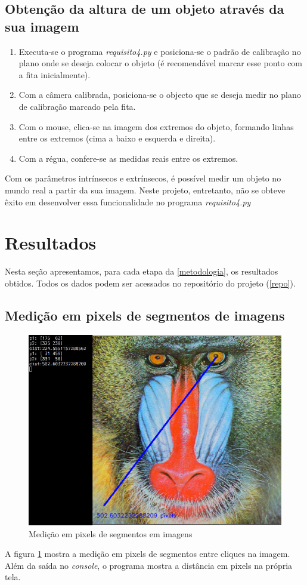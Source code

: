 \documentclass[conference]{IEEEtran}
\begin{document}
\subsection{Obtenção da altura de um objeto através da sua imagem}
\begin{enumerate}
\item Executa-se o programa \textit{requisito4.py} e posiciona-se o padrão de calibração no plano onde se deseja colocar o objeto (é recomendável marcar esse ponto com a fita inicialmente).
\item Com a câmera calibrada, posiciona-se o objecto que se deseja medir no plano de calibração marcado pela fita.
\item Com o mouse, clica-se na imagem dos extremos do objeto, formando linhas entre os extremos (cima a baixo e esquerda e direita).
\item Com a régua, confere-se as medidas reais entre os extremos.
\end{enumerate}
Com os parâmetros intrínsecos e extrínsecos,  é possível medir um objeto no mundo real a partir da sua imagem. Neste projeto, entretanto, não se obteve êxito em desenvolver essa funcionalidade no programa \textit{requisito4.py}

\section{Resultados}
Nesta seção apresentamos, para cada etapa da \ref{metodologia}, os resultados obtidos. Todos os dados podem ser acessados no repositório do projeto (\ref{repo}).
\subsection{Medição em pixels de segmentos de imagens}
\begin{figure}[ht!]\label{baboon}
\begin{center}
\includegraphics[width= .5\columnwidth]{baboon.jpg}
\caption{Medição em pixels de segmentos em imagens}
\end{center}
\end{figure}
A figura \ref{baboon} mostra a medição em pixels de segmentos entre cliques na imagem. Além da saída no \textit{console}, o programa mostra a distância em pixels na própria tela.
\end{document}
